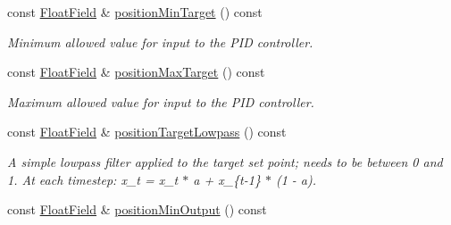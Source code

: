 \begin{DoxyCompactItemize}
\mbox{\label{classhebi_1_1Info_1_1Settings_1_1Actuator_1_1PositionGains_a88bbe5ad0be323aa3232ba61a13f5bf3}} 
const \hyperlink{classhebi_1_1Info_1_1FloatField}{Float\+Field} \& \hyperlink{classhebi_1_1Info_1_1Settings_1_1Actuator_1_1PositionGains_a88bbe5ad0be323aa3232ba61a13f5bf3}{position\+Min\+Target} () const
\begin{DoxyCompactList}\small\item\em Minimum allowed value for input to the P\+ID controller. \end{DoxyCompactList}\item 
\mbox{\label{classhebi_1_1Info_1_1Settings_1_1Actuator_1_1PositionGains_a8b875211de6d41aaf5b6e806e7602b24}} 
const \hyperlink{classhebi_1_1Info_1_1FloatField}{Float\+Field} \& \hyperlink{classhebi_1_1Info_1_1Settings_1_1Actuator_1_1PositionGains_a8b875211de6d41aaf5b6e806e7602b24}{position\+Max\+Target} () const
\begin{DoxyCompactList}\small\item\em Maximum allowed value for input to the P\+ID controller. \end{DoxyCompactList}\item 
\mbox{\label{classhebi_1_1Info_1_1Settings_1_1Actuator_1_1PositionGains_a820fd89205be03187ca0bac2674ff597}} 
const \hyperlink{classhebi_1_1Info_1_1FloatField}{Float\+Field} \& \hyperlink{classhebi_1_1Info_1_1Settings_1_1Actuator_1_1PositionGains_a820fd89205be03187ca0bac2674ff597}{position\+Target\+Lowpass} () const
\begin{DoxyCompactList}\small\item\em A simple lowpass filter applied to the target set point; needs to be between 0 and 1. At each timestep\+: x\+\_\+t = x\+\_\+t $\ast$ a + x\+\_\+\{t-\/1\} $\ast$ (1 -\/ a). \end{DoxyCompactList}\item 
\mbox{\label{classhebi_1_1Info_1_1Settings_1_1Actuator_1_1PositionGains_a65db479fa946847e84fcf7658c1eadb8}} 
const \hyperlink{classhebi_1_1Info_1_1FloatField}{Float\+Field} \& \hyperlink{classhebi_1_1Info_1_1Settings_1_1Actuator_1_1PositionGains_a65db479fa946847e84fcf7658c1eadb8}{position\+Min\+Output} () const

\end{DoxyCompactItemize}
